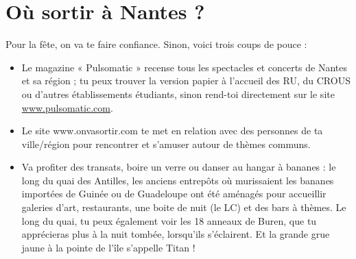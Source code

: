 \section{Où sortir à Nantes ?}\trad
Pour la fête, on va te faire confiance. Sinon, voici trois coups de pouce :
\begin{itemize}
  \item Le magazine « Pulsomatic » recense tous les spectacles et concerts de Nantes et sa région ; tu peux trouver la version papier à l'accueil des RU, du CROUS ou d'autres établissements étudiants, sinon rend-toi directement sur le site \url{www.pulsomatic.com}.
  \item Le site www.onvasortir.com te met en relation avec des personnes de ta ville/région pour rencontrer et s'amuser autour de thèmes communs.
  \item Va profiter des transats, boire un verre ou danser au hangar à bananes : le long du quai des Antilles, les anciens entrepôts où murissaient les bananes importées de Guinée ou de Guadeloupe ont été aménagés pour accueillir galeries d'art, restaurants, une boite de nuit (le LC) et des bars à thèmes. Le long du quai, tu peux également voir les 18 anneaux de Buren, que tu apprécieras plus à la nuit tombée, lorsqu'ils s'éclairent. Et la grande grue jaune à la pointe de l'île s'appelle Titan !
\end{itemize}

